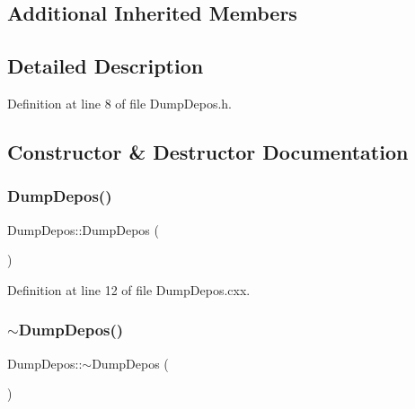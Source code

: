 \subsection*{Additional Inherited Members}


\subsection{Detailed Description}


Definition at line 8 of file Dump\+Depos.\+h.



\subsection{Constructor \& Destructor Documentation}
\mbox{\label{class_wire_cell_1_1_dump_depos_a973919adfa8658af63f4747681fa57b8}} 
\subsubsection{\texorpdfstring{Dump\+Depos()}{DumpDepos()}}
{\footnotesize\ttfamily Dump\+Depos\+::\+Dump\+Depos (\begin{DoxyParamCaption}{ }\end{DoxyParamCaption})}



Definition at line 12 of file Dump\+Depos.\+cxx.

\mbox{\label{class_wire_cell_1_1_dump_depos_a02211aa77bc3ff53eb5d4c2e897732cf}} 
\subsubsection{\texorpdfstring{$\sim$\+Dump\+Depos()}{~DumpDepos()}}
{\footnotesize\ttfamily Dump\+Depos\+::$\sim$\+Dump\+Depos (\begin{DoxyParamCaption}{ }\end{DoxyParamCaption})\hspace{0.3cm}{\ttfamily [virtual]}}



